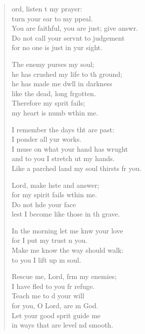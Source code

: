 \settowidth{\versewidth}{You are faithful, you are just; give answer. +}
\begin{verse}%
  \begin{patverse}
    ord, listen t my prayer:\Med\\
    turn your ear to my ppeal.\\
    You are faithful, you are just; give answr.\Flex\\
    Do not call your servnt to judgement\\
    for no one is just in yur sight.

    The enemy purses my soul;\Med\\
    he has crushed my life to th ground;\\
    he has made me dwll in darkness\Med\\
    like the dead, long frgotten.\\
    Therefore my sp\pointup{\i}rit fails;\Med\\
    my heart is numb w\pointup{\i}thin me.

    I remember the days tht are past:\Med\\
    I ponder all yur works.\\
    I muse on what your hand has wrught\Flex\\
    and to you I stretch ut my hands.\Med\\
    Like a parched land my soul thirsts fr you.

    Lord, make hste and answer;\Med\\
    for my spirit fails w\pointup{\i}thin me.\\
    Do not h\pointup{\i}de your face\Med\\
    lest I become like those in th grave.

    In the morning let me knw your love\Med\\
    for I put my trust \pointup{\i}n you.\\
    Make me know the way  should walk:\Med\\
    to you I lift up m soul.

    Rescue me, Lord, frm my enemies;\Med\\
    I have fled to you fr refuge.\\
    Teach me to d your will\Med\\
    for you, O Lord, are m God.\\
    Let your good sp\pointup{\i}rit guide me\Med\\
    in ways that are level nd smooth.


\end{patverse}
\end{verse}
